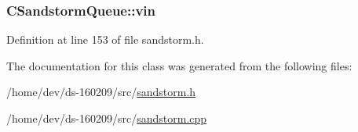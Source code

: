 \subsubsection[{vin}]{ C\+Sandstorm\+Queue\+::vin}\label{class_c_sandstorm_queue_a4c2e9dc92126c22f8c095577d0f8782e}


Definition at line 153 of file sandstorm.\+h.



The documentation for this class was generated from the following files\+:\begin{DoxyCompactItemize}
\item 
/home/dev/ds-\/160209/src/\hyperlink{sandstorm_8h}{sandstorm.\+h}\item 
/home/dev/ds-\/160209/src/\hyperlink{sandstorm_8cpp}{sandstorm.\+cpp}\end{DoxyCompactItemize}
